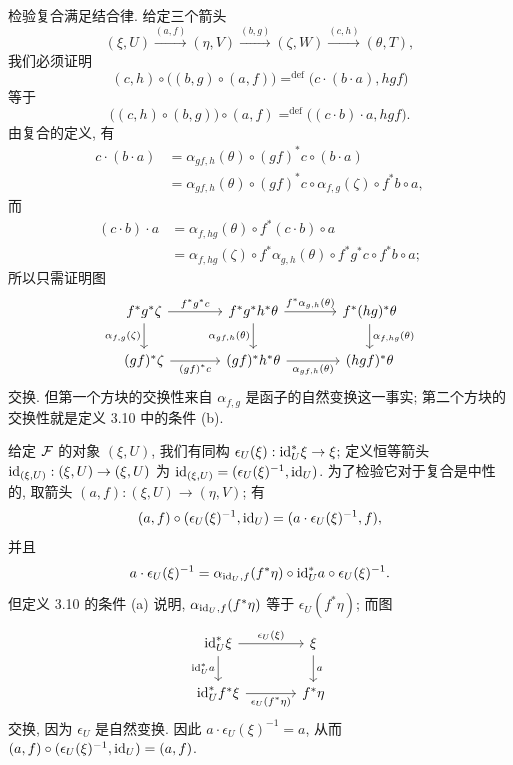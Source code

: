 检验复合满足结合律. 给定三个箭头
\[
(\xi,U)\xrightarrow{(a,f)}(\eta,V)\xrightarrow{(b,g)}(\zeta,W)
\xrightarrow{(c,h)}(\theta,T),
\]
我们必须证明
\[
(c,h)\circ\bigl((b,g)\circ(a,f)\bigr)\mathrel{\mathop=^{\mathrm{def}}}
\bigl(c\cdot(b\cdot a),hgf\bigr)
\]
等于
\[
\bigl((c,h)\circ(b,g)\bigr)\circ(a,f)\mathrel{\mathop=^{\mathrm{def}}}
\bigl((c\cdot b)\cdot a,hgf\bigr).
\]
由复合的定义, 有
\[
\begin{aligned}
c\cdot(b\cdot a)
&=\alpha_{gf,h}(\theta)\circ(gf)^*c\circ(b\cdot a)\\
&=\alpha_{gf,h}(\theta)\circ(gf)^*c\circ\alpha_{f,g}(\zeta)\circ f^*b\circ a,
\end{aligned}
\]
而
\[
\begin{aligned}
(c\cdot b)\cdot a
&=\alpha_{f,hg}(\theta)\circ f^*(c\cdot b)\circ a\\
&=\alpha_{f,hg}(\zeta)\circ f^*\alpha_{g,h}(\theta)\circ f^*g^*c\circ f^*b\circ a;
\end{aligned}
\]
所以只需证明图
\[
\begin{tikzcd}[column sep=large]
f^*g^*\zeta\arrow[r,"{f^*g^*c}"]\arrow[d,"{\alpha_{f,g}(\zeta)}"']&f^*g^*h^*\theta\arrow[r,"{f^*\alpha_{g,h}(\theta)}"]\arrow[d,"{\alpha_{gf,h}(\theta)}"']&f^*(hg)^*\theta\arrow[d,"{\alpha_{f,hg}(\theta)}"]\\
(gf)^*\zeta\arrow[r,"{(gf)^*c}"']&(gf)^*h^*\theta\arrow[r,"{\alpha_{gf,h}(\theta)}"']&(hgf)^*\theta
\end{tikzcd}
\]
交换. 但第一个方块的交换性来自 $\alpha_{f,g}$ 是函子的自然变换这一事实; 第二个方块的交换性就是定义 3.10 中的条件 (b).

给定 $\mathcal F$ 的对象 $(\xi,U)$, 我们有同构 $\epsilon_U(\xi):\mathrm{id}_U^*\xi\to\xi$; 定义恒等箭头 $\mathrm{id}_{(\xi,U)}:(\xi,U)\to(\xi,U)$ 为 $\mathrm{id}_{(\xi,U)}=(\epsilon_U(\xi)^{-1},\mathrm{id}_U)$. 为了检验它对于复合是中性的, 取箭头 $(a,f):(\xi,U)\to(\eta,V)$; 有
\[
(a,f)\circ(\epsilon_U(\xi)^{-1},\mathrm{id}_U)
=(a\cdot\epsilon_U(\xi)^{-1},f),
\]
并且
\[
a\cdot\epsilon_U(\xi)^{-1}
=\alpha_{\mathrm{id}_U,f}(f^*\eta)\circ\mathrm{id}_U^*a\circ\epsilon_U(\xi)^{-1}.
\]
但定义 3.10 的条件 (a) 说明, $\alpha_{\mathrm{id}_U,f}(f^*\eta)$ 等于 $\epsilon_U(f^*\eta)$; 而图
\[
\begin{tikzcd}[column sep=large]
\id_U^*\xi\arrow[r,"{\epsilon_U(\xi)}"]\arrow[d,"{\id_U^*a}"']&\xi\arrow[d,"{a}"]\\
\id_U^*f^*\xi\arrow[r,"{\epsilon_U(f^*\eta)}"']&f^*\eta
\end{tikzcd}
\]
交换, 因为 $\epsilon_U$ 是自然变换. 因此 $a\cdot\epsilon_U(\xi)^{-1}=a$, 从而 $(a,f)\circ(\epsilon_U(\xi)^{-1},\mathrm{id}_U)=(a,f)$.

